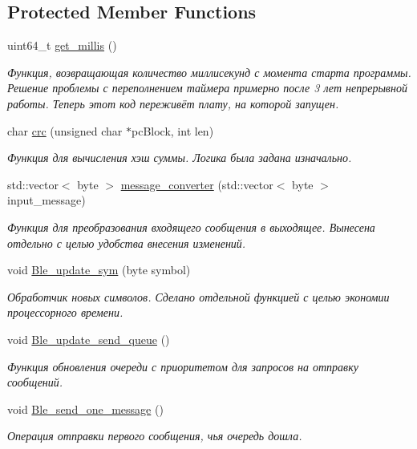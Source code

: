 \subsection*{Protected Member Functions}
\begin{DoxyCompactItemize}
\item 
uint64\+\_\+t \hyperlink{classBleConverter_a52ed15bca443802f8c3c5e2fdde0b82e}{get\+\_\+millis} ()
\begin{DoxyCompactList}\small\item\em Функция, возвращающая количество миллисекунд с момента старта программы.  Решение проблемы с переполнением таймера примерно после 3 лет непрерывной работы. Теперь этот код переживёт плату, на которой запущен. \end{DoxyCompactList}\item 
char \hyperlink{classBleConverter_a232fa1dd4c43d37201656235bde26173}{crc} (unsigned char $\ast$pc\+Block, int len)
\begin{DoxyCompactList}\small\item\em Функция для вычисления хэш суммы.  Логика была задана изначально. \end{DoxyCompactList}\item 
std\+::vector$<$ byte $>$ \hyperlink{classBleConverter_a29176df3aa77e74b459135d6e4db195e}{message\+\_\+converter} (std\+::vector$<$ byte $>$ input\+\_\+message)
\begin{DoxyCompactList}\small\item\em Функция для преобразования входящего сообщения в выходящее.  Вынесена отдельно с целью удобства внесения изменений. \end{DoxyCompactList}\item 
void \hyperlink{classBleConverter_a9c8be58a0630f113cc98d1163aebc0fa}{Ble\+\_\+update\+\_\+sym} (byte symbol)
\begin{DoxyCompactList}\small\item\em Обработчик новых символов.  Сделано отдельной функцией с целью экономии процессорного времени. \end{DoxyCompactList}\item 
\mbox{\label{classBleConverter_a46793fb8aa5d69ddd6fe7a1da2198130}} 
void \hyperlink{classBleConverter_a46793fb8aa5d69ddd6fe7a1da2198130}{Ble\+\_\+update\+\_\+send\+\_\+queue} ()
\begin{DoxyCompactList}\small\item\em Функция обновления очереди с приоритетом для запросов на отправку сообщений. \end{DoxyCompactList}\item 
\mbox{\label{classBleConverter_a966f12ea117f813e474d1ee0f213ec52}} 
void \hyperlink{classBleConverter_a966f12ea117f813e474d1ee0f213ec52}{Ble\+\_\+send\+\_\+one\+\_\+message} ()
\begin{DoxyCompactList}\small\item\em Операция отправки первого сообщения, чья очередь дошла. \end{DoxyCompactList}\end{DoxyCompactItemize}
